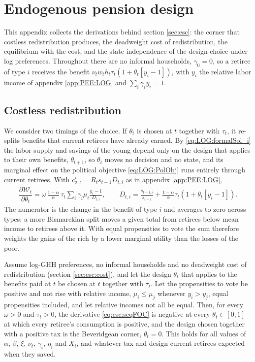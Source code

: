 \section{Endogenous pension design}\label{app:esc}\setcounter{equation}{0}
This appendix collects the derivations behind section \ref{sec:esc}: the corner that costless redistribution produces, the deadweight cost of redistribution, the equilibrium with the cost, and the state independence of the design choice under log preferences. Throughout there are no informal households, $\gamma_0 = 0$, so a retiree of type $i$ receives the benefit $\nu_t w_t h_t\tau_t\left(1+\theta_t\left[y_i-1\right]\right)$, with $y_i$ the relative labor income of appendix \ref{app:PEE:LOG} and $\sum_i\gamma_i y_i = 1$.

\subsection{Costless redistribution}\label{app:esc:corner}
We consider two timings of the choice. If $\theta_t$ is chosen at $t$ together with $\tau_t$, it re-splits benefits that current retirees have already earned. By \eqref{eq:LOG:formalSol_i} the labor supply and savings of the young depend only on the design that applies to their own benefits, $\theta_{t+1}$, so $\theta_t$ moves no decision and no state, and its marginal effect on the political objective \eqref{eq:LOG:PolObj} runs entirely through current retirees. With $c_{2,t}^i = R_ts_{t-1}D_{t,i}$ as in appendix \ref{app:PEE:LOG},
\begin{align}\label{eq:esc:seqFOC}
   \dfrac{\partial \mathcal{W}_t}{\partial \theta_t} =\omega\,\frac{1-\alpha}{\alpha}\,\tau_t\sum_i\gamma_i\mu_i\frac{y_i-1}{D_{t,i}}, \qquad D_{t,i} = \frac{s_{t-1,i}}{s_{t-1}}+\frac{1-\alpha}{\alpha}\tau_t\left(1+\theta_t\left[y_i-1\right]\right).
\end{align}
The numerator is the change in the benefit of type $i$ and averages to zero across types: a more Bismarckian split moves a given total from retirees below mean income to retirees above it. With equal propensities to vote the sum therefore weights the gains of the rich by a lower marginal utility than the losses of the poor.

\begin{proposition}\label{prop:esc:corner}
Assume log-GHH preferences, no informal households and no deadweight cost of redistribution (section \ref{sec:esc:cost}), and let the design $\theta_t$ that applies to the benefits paid at $t$ be chosen at $t$ together with $\tau_t$. Let the propensities to vote be positive and not rise with relative income, $\mu_i \leq \mu_j$ whenever $y_i > y_j$, equal propensities included, and let relative incomes not all be equal. Then, for every $\omega > 0$ and $\tau_t > 0$, the derivative \eqref{eq:esc:seqFOC} is negative at every $\theta_t \in [0,1]$ at which every retiree's consumption is positive, and the design chosen together with a positive tax is the Beveridgean corner, $\theta_t = 0$. This holds for all values of $\alpha$, $\beta$, $\xi$, $\nu_t$, $\gamma_i$, $\eta_i$ and $X_i$, and whatever tax and design current retirees expected when they saved.
\end{proposition}

